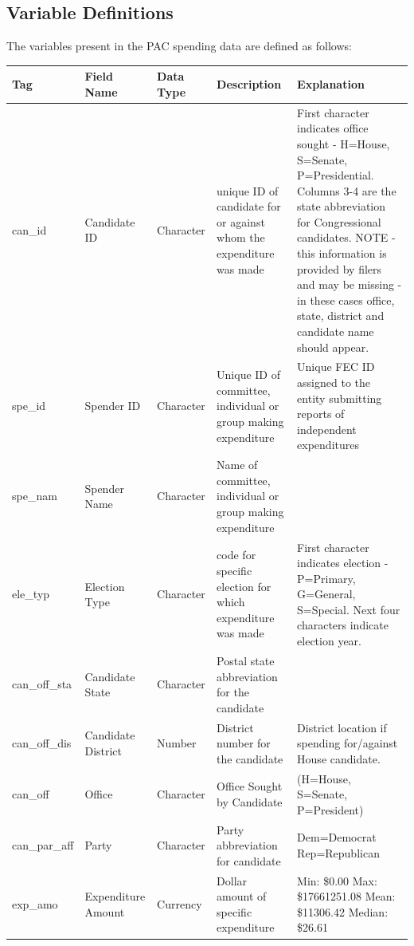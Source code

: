 \documentclass[11pt]{article}\usepackage{graphicx, color}
\begin{document}
\subsection{Variable Definitions}
The variables present in the PAC spending data are defined as follows:
\begin{landscape}
\begin{center}
\begin{longtable}[\textwidth]{l l l p{0.4\textheight} p{0.4\textheight}}
Tag & Field Name    & Data Type	& Description	& Explanation \\
\hline
can\_id  & Candidate ID  & Character &unique ID of candidate for or against whom the expenditure was made	& First character indicates office sought - H=House, S=Senate, P=Presidential. Columns 3-4 are the state abbreviation for Congressional candidates. NOTE - this information is provided by filers and may be missing - in these cases office, state, district and candidate name should appear. \\
spe\_id & Spender ID & Character & Unique ID of committee, individual or group making expenditure	&	Unique FEC ID assigned to the entity submitting reports of independent expenditures \\
spe\_nam & Spender Name &	Character &	Name of committee, individual or group making expenditure	& \\
ele\_typ & Election Type & Character & code for specific election for which expenditure was made & First character indicates election - P=Primary, G=General, S=Special. Next four characters indicate election year. \\
can\_off\_sta & Candidate State	& Character	& Postal state abbreviation for the candidate	& \\	 
can\_off\_dis &	Candidate District & Number &	District number for the candidate	&	District location if spending for/against House candidate.\\
can\_off & Office &	Character &	Office Sought by Candidate &	(H=House, S=Senate, P=President)\\
can\_par\_aff &	Party	& Character &	Party abbreviation for candidate & Dem=Democrat \newline Rep=Republican \\
exp\_amo & Expenditure Amount &	Currency & Dollar amount of specific expenditure & 
Min: \$0.00 \newline
Max: \$17661251.08 \newline
Mean: \$11306.42 \newline
Median: \$26.61\\

\end{longtable}
\end{center}
\end{landscape}
\end{document}
